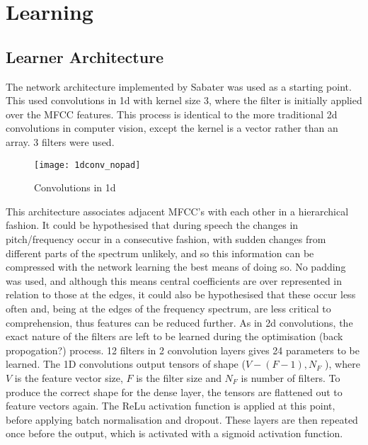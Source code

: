 
\chapter{Learning} %

\label{Chapter3} %


\section{Learner Architecture}
The network architecture implemented by Sabater was used as a starting point. This used convolutions in 1d with kernel size 3, where the filter is initially applied over the MFCC features. This process is identical to the more traditional 2d convolutions in computer vision, except the kernel is a vector rather than an array. 3 filters were used.
\begin{wrapfigure}{r}{0.3\textwidth} 
	\texttt{[image: 1dconv\_nopad]}
	\caption{Convolutions in 1d \cite{catalunya_2017}}
	\label{1dconv}
\end{wrapfigure}
This architecture associates adjacent MFCC’s with each other in a hierarchical fashion. It could be hypothesised that during speech the changes in pitch/frequency occur in a consecutive fashion, with sudden changes from different parts of the spectrum unlikely, and so this information can be compressed with the network learning the best means of doing so. No padding was used, and although this means central coefficients are over represented in relation to those at the edges, it could also be hypothesised that these occur less often and, being at the edges of the frequency spectrum, are less critical to comprehension, thus features can be reduced further. As in 2d convolutions, the exact nature of the filters are left to be learned during the optimisation (back propogation?) process. 12 filters in 2 convolution layers gives 24 parameters to be learned.
The 1D convolutions output tensors of shape ($V-(F-1),N_{F}$ ), where $V$ is the feature vector size, $F$ is the filter size and $N_{F}$ is number of filters. To produce the correct shape for the dense layer, the tensors are flattened out to feature vectors again. The ReLu activation function is applied at this point, before applying batch normalisation and dropout. These layers are then repeated once before the output, which is activated with a sigmoid activation function. 
